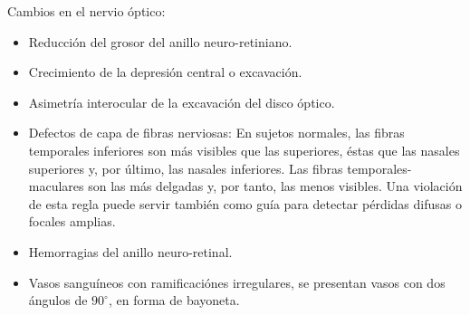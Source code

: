 \begin{description}
Cambios en el nervio \'optico:
\begin{itemize}
	\item Reducci\'on del grosor del anillo neuro-retiniano.
	\item Crecimiento de la depresi\'on central o excavaci\'on.
	\item Asimetr\'ia interocular de la excavaci\'on del disco \'optico.
	\item Defectos de capa de fibras nerviosas: En sujetos normales, las fibras temporales inferiores son m\'as visibles que las superiores, \'estas que las nasales superiores y, por \'ultimo, las nasales inferiores. Las fibras temporales-maculares son las m\'as delgadas y, por tanto, las menos visibles. Una violaci\'on de esta regla puede servir tambi\'en como gu\'ia para detectar p\'erdidas difusas o focales amplias.
	\item Hemorragias del anillo neuro-retinal.
	\item Vasos sangu\'ineos con ramificaci\'ones irregulares, se presentan vasos con dos ángulos de $90^{\circ}$, en forma de bayoneta.
\end{itemize}
\end{description}


